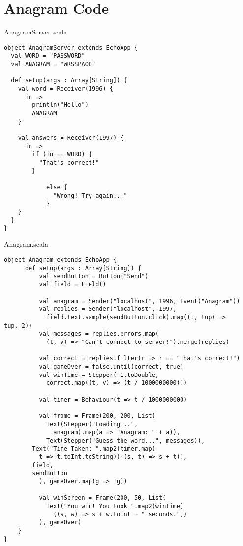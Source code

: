 \chapter{Anagram Code}

AnagramServer.scala

\begin{verbatim}
object AnagramServer extends EchoApp {
  val WORD = "PASSWORD"
  val ANAGRAM = "WRSSPAOD"

  def setup(args : Array[String]) {	
    val word = Receiver(1996) {
      in =>
        println("Hello")
        ANAGRAM
    }

  	val answers = Receiver(1997) {
  	  in =>
  	    if (in == WORD) {
  	      "That's correct!"
  	    }

  			else {
  			  "Wrong! Try again..."
  			}
  	}
  }
}
\end{verbatim}

Anagram.scala

\begin{verbatim}
object Anagram extends EchoApp {
	  def setup(args : Array[String]) {
		  val sendButton = Button("Send")
		  val field = Field()
		  
		  val anagram = Sender("localhost", 1996, Event("Anagram"))
		  val replies = Sender("localhost", 1997, 
		    field.text.sample(sendButton.click).map((t, tup) => tup._2))
		  val messages = replies.errors.map(
		    (t, v) => "Can't connect to server!").merge(replies)

		  val correct = replies.filter(r => r == "That's correct!")
		  val gameOver = false.until(correct, true)
		  val winTime = Stepper(-1.toDouble, 
		    correct.map((t, v) => (t / 1000000000)))

		  val timer = Behaviour(t => t / 1000000000)

		  val frame = Frame(200, 200, List(
		    Text(Stepper("Loading...", 
		      anagram).map(a => "Anagram: " + a)),
		    Text(Stepper("Guess the word...", messages)),
        Text("Time Taken: ".map2(timer.map(
          t => t.toInt.toString))((s, t) => s + t)),
        field,
        sendButton
		  ), gameOver.map(g => !g))

		  val winScreen = Frame(200, 50, List(
		    Text("You win! You took ".map2(winTime)
		      ((s, w) => s + w.toInt + " seconds."))
		  ), gameOver)
	}
}
\end{verbatim}